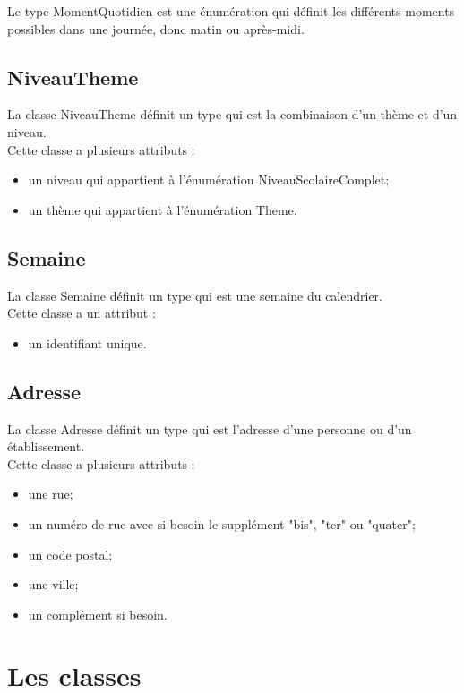 \documentclass[asi, sansVersion]{picInsa}
\begin{document}
Le type MomentQuotidien est une énumération qui définit les différents moments possibles dans une journée, donc matin ou après-midi.

\subsection*{NiveauTheme}

La classe NiveauTheme définit un type qui est la combinaison d'un thème et d'un niveau.\\
Cette classe a plusieurs attributs : 
\begin{itemize}
\item un niveau qui appartient à l'énumération NiveauScolaireComplet;
\item un thème qui appartient à l'énumération Theme.
\end{itemize}

\subsection*{Semaine}

La classe Semaine définit un type qui est une semaine du calendrier.\\
Cette classe a un attribut : 
\begin{itemize}
\item un identifiant unique.
\end{itemize}

\subsection*{Adresse}

La classe Adresse définit un type qui est l'adresse d'une personne ou d'un établissement.\\
Cette classe a plusieurs attributs : 
\begin{itemize}
\item une rue;
\item un numéro de rue avec si besoin le supplément "bis", "ter" ou "quater";
\item un code postal;
\item une ville;
\item un complément si besoin.
\end{itemize}

\section{Les classes}
\end{document}
